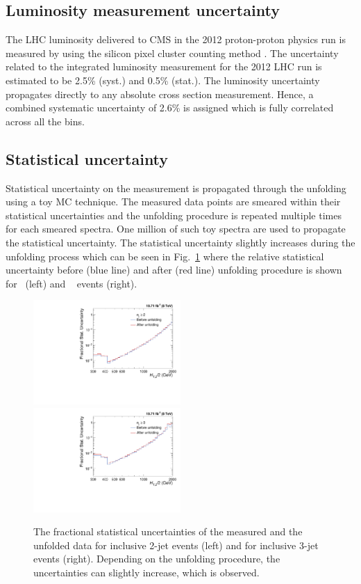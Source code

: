  \subsection{Luminosity measurement uncertainty}
The LHC luminosity delivered to CMS in the 2012 proton-proton physics run is measured  by using the silicon pixel cluster counting method \cite{CMS:2013gfa}. The uncertainty related to the integrated luminosity measurement for the 2012 LHC run is estimated to be 2.5\% (syst.) and 0.5\% (stat.). The luminosity uncertainty propagates directly to any absolute cross section measurement. Hence, a combined systematic uncertainty of 2.6\% is assigned which is fully correlated across all the \httwo bins. 

\subsection{Statistical uncertainty}
\label{sec:unfolding_stat}
Statistical uncertainty on the measurement is propagated through the unfolding using a toy MC technique. The measured data points are smeared within their statistical uncertainties and the unfolding procedure is repeated multiple times for each smeared spectra. One million of such toy spectra are used to propagate the statistical uncertainty. The statistical uncertainty slightly increases during the unfolding process which can be seen in Fig.~\ref{fig:stat_unc} where the relative statistical uncertainty before (blue line) and after (red line) unfolding procedure is shown for \njt~(left) and \njth~ events (right). 

\begin{figure}[h]
  \begin{center}
    \includegraphics[width=0.5\textwidth]{Plots_HT_2_150/Comparison_stat_unc_2_HT_2_150.pdf}%
    \includegraphics[width=0.5\textwidth]{Plots_HT_2_150/Comparison_stat_unc_3_HT_2_150.pdf}
    \caption{The fractional statistical uncertainties of the measured and the unfolded data for inclusive 2-jet events (left) and for 
      inclusive 3-jet events (right). Depending on the unfolding procedure, the uncertainties can slightly increase, which is observed.}
    \label{fig:stat_unc}
  \end{center}
\end{figure}

